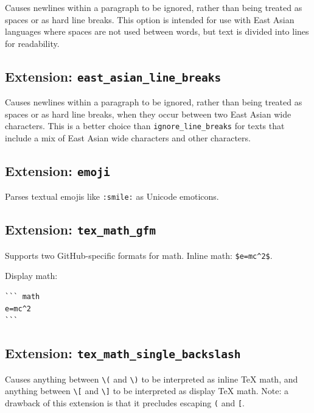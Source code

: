 \documentclass[
  b5paper
]{book}
\begin{document}
Causes newlines within a paragraph to be ignored, rather than being
treated as spaces or as hard line breaks. This option is intended for
use with East Asian languages where spaces are not used between words,
but text is divided into lines for readability.

\subsection{\texorpdfstring{Extension:
\texttt{east\_asian\_line\_breaks}}{Extension: east\_asian\_line\_breaks}}\label{extension-east_asian_line_breaks}

Causes newlines within a paragraph to be ignored, rather than being
treated as spaces or as hard line breaks, when they occur between two
East Asian wide characters. This is a better choice than
\texttt{ignore\_line\_breaks} for texts that include a mix of East Asian
wide characters and other characters.

\subsection{\texorpdfstring{Extension:
\texttt{emoji}}{Extension: emoji}}\label{extension-emoji}

Parses textual emojis like \texttt{:smile:} as Unicode emoticons.

\subsection{\texorpdfstring{Extension:
\texttt{tex\_math\_gfm}}{Extension: tex\_math\_gfm}}\label{extension-tex_math_gfm}

Supports two GitHub-specific formats for math. Inline math:
\texttt{\$\textasciigrave{}e=mc\^{}2\textasciigrave{}\$}.

Display math:

\begin{verbatim}
``` math
e=mc^2
```
\end{verbatim}

\subsection{\texorpdfstring{Extension:
\texttt{tex\_math\_single\_backslash}}{Extension: tex\_math\_single\_backslash}}\label{extension-tex_math_single_backslash}

Causes anything between \texttt{\textbackslash{}(} and
\texttt{\textbackslash{})} to be interpreted as inline TeX math, and
anything between \texttt{\textbackslash{}{[}} and
\texttt{\textbackslash{}{]}} to be interpreted as display TeX math.
Note: a drawback of this extension is that it precludes escaping
\texttt{(} and \texttt{{[}}.
\end{document}
